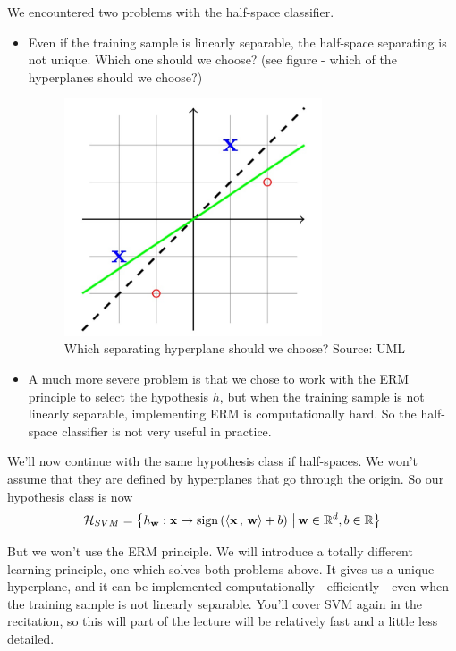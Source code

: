 \documentclass[11pt]{article}
\newcommand{\Hc}{\mathcal{H}}
\newcommand{\innerr}[2]{{\left\langle #1\,,\,#2 \right\rangle}}
\newcommand{\VV}[1]{\mathbf{#1}}
\begin{document}
We encountered two problems with the half-space classifier. 
\begin{itemize}
  \item 
    Even if the training sample is linearly separable, the half-space separating
    is not unique. Which one should we choose? (see figure - which of the
    hyperplanes should we choose?)

    \begin{figure}[h!]
      \centering
      \includegraphics[width=3in]{nonuniq.pdf}
      \caption{Which separating hyperplane should we choose? Source: UML}
    \end{figure}


  \item A much more severe problem is that we chose to work with the ERM
    principle to select the hypothesis $h$, but when the training sample is not
    linearly separable, implementing ERM is computationally hard. So the
    half-space classifier is not very useful in practice. 
    
\end{itemize}

We'll now continue with the same hypothesis class if half-spaces. We won't
assume that they are defined by hyperplanes that go through the origin. So our
hypothesis class is now
\[
  \Hc_{SVM} = \left\{  h_\VV{w}: \VV{x} \mapsto \text{sign}\left(
  \innerr{\VV{x}}{\VV{w}}  +b \right)
\,\big|\, \VV{w}\in \reals^d, b\in \reals \right\}
\]


But we won't use the ERM principle. We will 
introduce a totally different learning principle, one which solves both problems
above. It gives us a unique hyperplane, and it can be implemented
computationally - efficiently - even when the training sample is not linearly
separable. You'll cover SVM again in the recitation, so this will part of the lecture
will be relatively fast and a little less detailed. 
\end{document}
